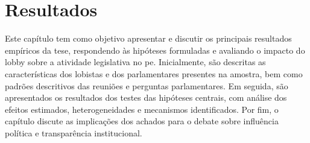\chapter{Resultados}
\label{chapter:resultados}
Este capítulo tem como objetivo apresentar e discutir os principais resultados empíricos da tese, respondendo às hipóteses formuladas e avaliando o impacto do lobby sobre a atividade legislativa no \acrshort{pe}. Inicialmente, são descritas as características dos lobistas e dos parlamentares presentes na amostra, bem como padrões descritivos das reuniões e perguntas parlamentares. Em seguida, são apresentados os resultados dos testes das hipóteses centrais, com análise dos efeitos estimados, heterogeneidades e mecanismos identificados. Por fim, o capítulo discute as implicações dos achados para o debate sobre influência política e transparência institucional.





